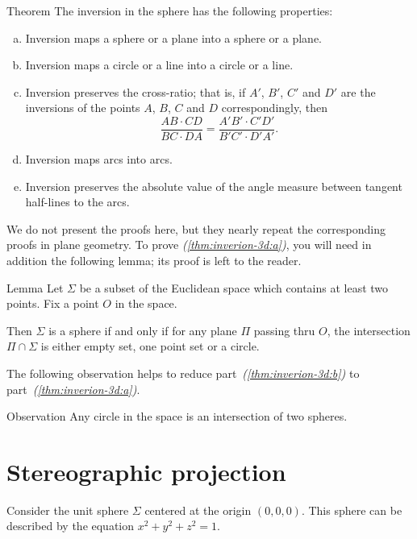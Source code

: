 \begin{thm}{Theorem}\label{thm:inverion-3d}
The inversion in the sphere has the following properties:
\begin{enumerate}[(a)]
\item\label{thm:inverion-3d:a} Inversion maps a sphere or a plane into a sphere or a plane.
\item\label{thm:inverion-3d:b} Inversion maps a circle or a line into a circle or a line. 
\item\label{thm:inverion-3d:cross-ratio} Inversion preserves the cross-ratio;
that is, if $A'$, $B'$, $C'$ and $D'$ are the inversions of the points $A$, $B$, $C$ and $D$ correspondingly,
then
$$\frac{AB\cdot CD}{BC\cdot DA}= \frac{A'B'\cdot C'D'}{B'C'\cdot D'A'}.$$
\item Inversion maps arcs into arcs.
\item\label{thm:inverion-3d:angle} Inversion preserves the absolute value of the angle
measure between tangent half-lines to the arcs.
\end{enumerate}
\end{thm}


We do not present the proofs here, but
they nearly repeat the corresponding proofs in plane geometry.
To prove \textit{(\ref{thm:inverion-3d:a})}, you will need in addition the following lemma;
its proof is left to the reader.

\begin{thm}{Lemma}
Let $\Sigma$ be a subset of the Euclidean space
which contains at least two points.
Fix a point $O$ in the space.

Then $\Sigma$ is 
a sphere 
if and only if
for any plane $\Pi$ passing thru $O$,
the intersection $\Pi\cap \Sigma$ is either empty set,
one point set or a circle.
\end{thm}  

The following observation helps to reduce part~\textit{(\ref{thm:inverion-3d:b})} to part~\textit{(\ref{thm:inverion-3d:a})}.

\begin{thm}{Observation}
Any circle in the space is an intersection of two spheres.
\end{thm}


\section*{Stereographic projection}

Consider the unit sphere $\Sigma$ 
centered at the origin $(0,0,0)$.
This sphere can be described by the equation $x^2+y^2+z^2=1$. 

